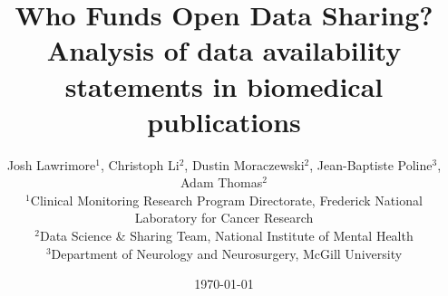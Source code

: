 
\title{Who Funds Open Data Sharing? Analysis of data availability statements in biomedical publications}

\author{
    Josh Lawrimore$^{1}$,
    Christoph Li$^{2}$,
    Dustin Moraczewski$^{2}$,
    Jean-Baptiste Poline$^{3}$,
    Adam Thomas$^{2}$ \\[1em]
    \small $^1$Clinical Monitoring Research Program Directorate, Frederick National Laboratory for Cancer Research \\
    \small $^2$Data Science \& Sharing Team, National Institute of Mental Health \\
    \small $^3$Department of Neurology and Neurosurgery, McGill University
}

\date{\today}
